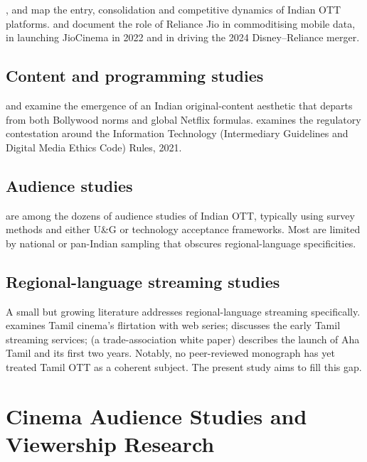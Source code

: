 \citet{kanozia2021}, \citet{singh2022ottstructure} and
\citet{parmar2021} map the entry, consolidation and competitive
dynamics of Indian OTT platforms.  \citet{economist2022jiocinema}
and \citet{economictimes2024jiomerger} document the role of Reliance
Jio in commoditising mobile data, in launching JioCinema in 2022 and
in driving the 2024 Disney--Reliance merger.

\subsection{Content and programming studies}

\citet{mehta2019} and \citet{punathambekar2018} examine the
emergence of an Indian original-content aesthetic that departs from
both Bollywood norms and global Netflix formulas.
\citet{nayak2021} examines the regulatory contestation around the
Information Technology (Intermediary Guidelines and Digital Media
Ethics Code) Rules, 2021.

\subsection{Audience studies}

\citet{singh2021,sharma2020otta,gupta2022uses,parmar2021,
chakraborty2022} are among the dozens of audience studies of Indian
OTT, typically using survey methods and either U\&G or technology
acceptance frameworks.  Most are limited by national or pan-Indian
sampling that obscures regional-language specificities.

\subsection{Regional-language streaming studies}

A small but growing literature addresses regional-language streaming
specifically.  \citet{nakassis2020} examines Tamil cinema's flirtation
with web series; \citet{velayutham2019} discusses the early Tamil
streaming services; \citet{aha2022launchreport} (a trade-association
white paper) describes the launch of Aha Tamil and its first two
years.  Notably, no peer-reviewed monograph has yet treated Tamil OTT
as a coherent subject.  The present study aims to fill this gap.

\section{Cinema Audience Studies and Viewership Research}
\label{sec:audience}

